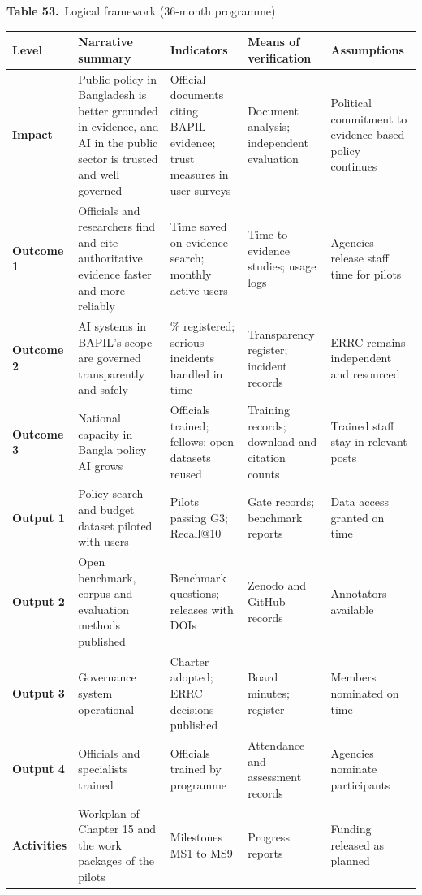 \documentclass[border=10pt]{standalone}
\begin{document}
\begin{minipage}{17cm}
{\large\bfseries Table 53.}\ {\large Logical framework (36-month programme)}\par\vspace{7pt}
\small
{}
\begin{tabularx}{\linewidth}{@{}>{\hsize=0.592\hsize\raggedright\arraybackslash}X>{\hsize=1.232\hsize\raggedright\arraybackslash}X>{\hsize=1.232\hsize\raggedright\arraybackslash}X>{\hsize=0.900\hsize\raggedright\arraybackslash}X>{\hsize=1.043\hsize\raggedright\arraybackslash}X@{}}
\arrayrulecolor{bapilrule}\toprule
\rowcolor{white}\textbf{Level} & \textbf{Narrative summary} & \textbf{Indicators} & \textbf{Means of verification} & \textbf{Assumptions} \\
\midrule
\textbf{Impact} & Public policy in Bangladesh is better grounded in evidence, and AI in the public sector is trusted and well governed & Official documents citing BAPIL evidence; trust measures in user surveys & Document analysis; independent evaluation & Political commitment to evidence-based policy continues \\
\textbf{Outcome 1} & Officials and researchers find and cite authoritative evidence faster and more reliably & Time saved on evidence search; monthly active users & Time-to-evidence studies; usage logs & Agencies release staff time for pilots \\
\textbf{Outcome 2} & AI systems in BAPIL’s scope are governed transparently and safely & 100\% registered; serious incidents handled in time & Transparency register; incident records & ERRC remains independent and resourced \\
\textbf{Outcome 3} & National capacity in Bangla policy AI grows & Officials trained; fellows; open datasets reused & Training records; download and citation counts & Trained staff stay in relevant posts \\
\textbf{Output 1} & Policy search and budget dataset piloted with users & Pilots passing G3; Recall@10 & Gate records; benchmark reports & Data access granted on time \\
\textbf{Output 2} & Open benchmark, corpus and evaluation methods published & Benchmark questions; releases with DOIs & Zenodo and GitHub records & Annotators available \\
\textbf{Output 3} & Governance system operational & Charter adopted; ERRC decisions published & Board minutes; register & Members nominated on time \\
\textbf{Output 4} & Officials and specialists trained & Officials trained by programme & Attendance and assessment records & Agencies nominate participants \\
\textbf{Activities} & Workplan of Chapter 15 and the work packages of the pilots & Milestones MS1 to MS9 & Progress reports & Funding released as planned \\
\bottomrule
\end{tabularx}
\par{}
\end{minipage}
\end{document}
